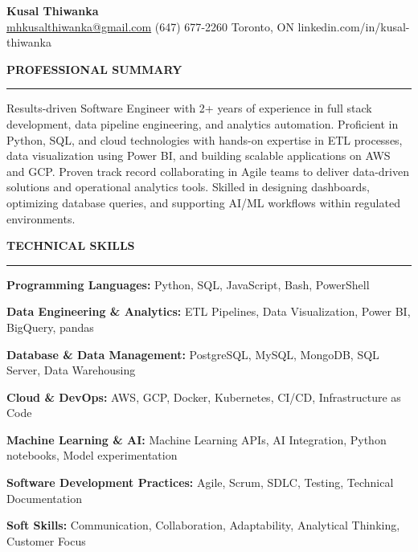 \documentclass[10pt,letterpaper]{article}
\begin{document}
\begin{center}
{\LARGE\textbf{Kusal Thiwanka}}\\[3pt]
\href{mailto:mhkusalthiwanka@gmail.com}{mhkusalthiwanka@gmail.com}\hspace{2em}%
(647) 677{-}2260\hspace{2em}%
Toronto, ON\hspace{2em}
linkedin.com/in/kusal-thiwanka
\end{center}

\vspace{6pt}

\textbf{PROFESSIONAL SUMMARY}\\[-8pt]
\noindent\rule{\textwidth}{1pt}

\vspace{-2pt}

Results-driven Software Engineer with 2+ years of experience in full stack development, data pipeline engineering, and analytics automation. Proficient in Python, SQL, and cloud technologies with hands-on expertise in ETL processes, data visualization using Power BI, and building scalable applications on AWS and GCP. Proven track record collaborating in Agile teams to deliver data-driven solutions and operational analytics tools. Skilled in designing dashboards, optimizing database queries, and supporting AI/ML workflows within regulated environments.

\vspace{8pt}

\textbf{TECHNICAL SKILLS}\\[-8pt]
\noindent\rule{\textwidth}{1pt}

\vspace{-2pt}

\textbf{Programming Languages:} Python, SQL, JavaScript, Bash, PowerShell

\textbf{Data Engineering \& Analytics:} ETL Pipelines, Data Visualization, Power BI, BigQuery, pandas

\textbf{Database \& Data Management:} PostgreSQL, MySQL, MongoDB, SQL Server, Data Warehousing

\textbf{Cloud \& DevOps:} AWS, GCP, Docker, Kubernetes, CI/CD, Infrastructure as Code

\textbf{Machine Learning \& AI:} Machine Learning APIs, AI Integration, Python notebooks, Model experimentation

\textbf{Software Development Practices:} Agile, Scrum, SDLC, Testing, Technical Documentation

\textbf{Soft Skills:} Communication, Collaboration, Adaptability, Analytical Thinking, Customer Focus
\end{document}
